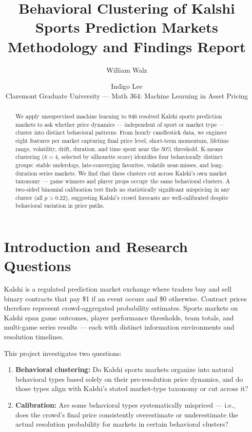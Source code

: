 \documentclass[11pt, a4paper]{article}
\title{\textbf{Behavioral Clustering of Kalshi Sports Prediction Markets}\\[0.4em]
\large Methodology and Findings Report}
\author{William Walz \and Indigo Lee\\[0.3em]
\small Claremont Graduate University --- Math 364: Machine Learning in Asset Pricing}
\date{}
\begin{document}
\maketitle

\begin{abstract}
We apply unsupervised machine learning to 946 resolved Kalshi sports prediction markets to ask whether price dynamics — independent of sport or market type — cluster into distinct behavioral patterns. From hourly candlestick data, we engineer eight features per market capturing final price level, short-term momentum, lifetime range, volatility, drift, duration, and time spent near the 50\% threshold. K-means clustering ($k=4$, selected by silhouette score) identifies four behaviorally distinct groups: stable underdogs, late-converging favorites, volatile near-misses, and long-duration series markets. We find that these clusters cut across Kalshi's own market taxonomy — game winners and player props occupy the same behavioral clusters. A two-sided binomial calibration test finds no statistically significant mispricing in any cluster (all $p > 0.22$), suggesting Kalshi's crowd forecasts are well-calibrated despite behavioral variation in price paths.
\end{abstract}

\tableofcontents
\vspace{1em}

\section{Introduction and Research Questions}

Kalshi is a regulated prediction market exchange where traders buy and sell binary contracts that pay \$1 if an event occurs and \$0 otherwise. Contract prices therefore represent crowd-aggregated probability estimates. Sports markets on Kalshi span game outcomes, player performance thresholds, team totals, and multi-game series results — each with distinct information environments and resolution timelines.

This project investigates two questions:

\begin{enumerate}[noitemsep]
  \item \textbf{Behavioral clustering:} Do Kalshi sports markets organize into natural behavioral types based solely on their pre-resolution price dynamics, and do those types align with Kalshi's stated market-type taxonomy or cut across it?
  \item \textbf{Calibration:} Are some behavioral types systematically mispriced — i.e., does the crowd's final price consistently overestimate or underestimate the actual resolution probability for markets in certain behavioral clusters?
\end{enumerate}
\end{document}
